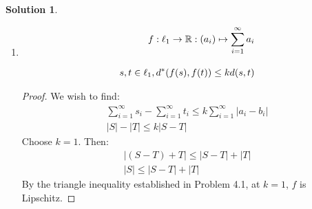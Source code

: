 \documentclass[12pt]{article}
\theoremstyle{definition} %
\newtheorem{solution}{Solution}
\theoremstyle{plain} %
\begin{document}
\begin{solution}
\begin{enumerate}
\begin{enumerate}
\begin{proof}
                    \begin{align}
                        \sum_{i=1}^{\infty} \left\vert a_i -b_{i} \right\vert +\sum_{i=1}^{\infty} \left\vert b_{i}-c_{i}  \right\vert \geq \sum_{i=1}^{\infty} \left\vert a_i -c_{i} \right\vert \\[10pt] 
                        \sum_{i=1}^{\infty} a_i = A, \sum_{i=1}^{\infty} b_i = B, \sum_{i=1}^{\infty} c_i = C \label{hw-5}\\[10pt] 
                        \left\vert A-B \right\vert +\left\vert B-C \right\vert \geq \left\vert A -C \right\vert \\[10pt] 
                        \left\vert A-B \right\vert +\left\vert B-C \right\vert \geq \left\vert (A-B)+(B-C) \right\vert \label{ti}
                    \end{align} 
    Where \autoref{hw-5} is proven in Homework 5 Problem 3.1, and \autoref{ti} is proven by the triangle inequality.
                \end{proof}
            \end{enumerate}
            \item \begin{align}
                f: \ell_1 \to \mathbb{\MakeUppercase{r}} : (a_{i}) \mapsto \sum_{i=1}^{\infty} a_{i}\\[10pt] 
                s,t \in \ell_1, d^{*}(f(s), f(t))\leq kd(s,t)
            \end{align}
            \begin{proof}
             We wish to find:
            \begin{align}
                \sum_{i=1}^{\infty} s_{i} - \sum_{i=1}^{\infty} t_{i} \leq k \sum_{i=1}^{\infty} \left\vert a_{i}-b_{i} \right\vert \\[10pt] 
                \left\vert S \right\vert -\left\vert T \right\vert \leq k\left\vert S-T \right\vert 
            \end{align} 
            Choose \(k=1\). Then:
            \begin{align}
                \left\vert \left( S-T \right)+T  \right\vert \leq \left\vert S-T \right\vert +\left\vert T \right\vert \\[10pt] 
                \left\vert S \right\vert \leq \left\vert S-T \right\vert +\left\vert T \right\vert 
            \end{align}
            By the triangle inequality established in Problem 4.1, at \(k = 1\), \(f\) is Lipschitz. 
            \end{proof}

\end{enumerate}
\end{solution}
\end{document}

